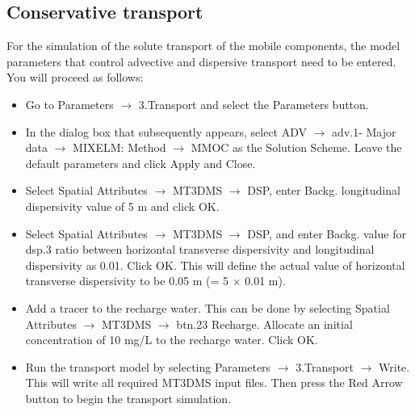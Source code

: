 
\subsection{Conservative transport}

For the simulation of the solute transport of the mobile components, 
the model parameters that control advective and dispersive transport need to be entered. 
You will proceed as follows:

\begin{itemize}
\item Go to {\color{blue}Parameters} $\rightarrow$ {\color{blue}3.Transport} and select the  {\color{blue}Parameters} button.
\item In the dialog box that subsequently appears, select {\color{blue}ADV} $\rightarrow$ {\color{blue}adv.1- Major data} $\rightarrow$ {\color{blue}MIXELM: Method} $\rightarrow$  {\color{blue}MMOC} as the Solution Scheme. Leave the default parameters and click {\color{blue}Apply} and Close.

\item Select {\color{blue}Spatial Attributes} $\rightarrow$ {\color{blue}MT3DMS} $\rightarrow$ {\color{blue}DSP}, enter {\color{blue}Backg. longitudinal dispersivity} value of 5 m and click {\color{blue}OK}.

\item Select {\color{blue}Spatial Attributes} $\rightarrow$ {\color{blue}MT3DMS} $\rightarrow$ {\color{blue}DSP}, and enter {\color{blue}Backg. value} for {\color{blue}dsp.3 ratio between horizontal transverse dispersivity} and {\color{blue}longitudinal dispersivity} as 0.01. Click {\color{blue}OK}. This will define the actual value of {\color{blue} horizontal transverse dispersivity} to be 0.05 m (= 5 $\times$ 0.01 m).

\item Add a tracer to the recharge water. This can be done by selecting {\color{blue}Spatial Attributes} $\rightarrow$ {\color{blue}MT3DMS} $\rightarrow$ {\color{blue}btn.23 Recharge}. Allocate an initial concentration of 10 mg/L to the recharge water. Click {\color{blue}OK}.

\item Run the transport model by selecting {\color{blue}Parameters} $\rightarrow$ {\color{blue}3.Transport} $\rightarrow$ {\color{blue}Write}. This will write all required MT3DMS input files. Then press the {\color{blue}Red Arrow} button to begin the transport simulation.


\end{itemize}
